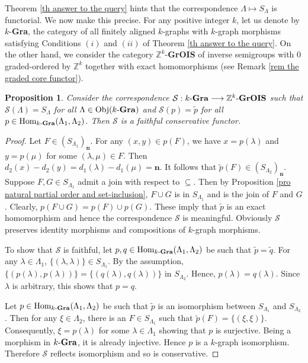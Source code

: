 \documentclass[a4paper,reqno,11pt]{amsart}
\numberwithin{equation}{section}
\newtheorem{prop}[thm]{Proposition}
\theoremstyle{definition}
\theoremstyle{remark}
\newcommand{\Obj}{\operatorname{Obj}}
\newcommand{\Hom}{\operatorname{Hom}}
\newcommand{\N}{\mathbf{n}}
\begin{document}
Theorem \ref{th answer to the query} hints that the correspondence $\Lambda\longmapsto S_\Lambda$ is functorial. We now make this precise. For any positive integer $k$, let us denote by $k$-\textbf{Gra}, the category of all finitely aligned $k$-graphs with $k$-graph morphisms satisfying Conditions $(i)$ and $(ii)$ of Theorem \ref{th answer to the query}. On the other hand, we consider the category $\mathbb{Z}^k$-\textbf{GrOIS} of inverse semigroups with $0$ graded-ordered by $\mathbb{Z}^k$ together with exact homomorphisms (see Remark \ref{rem the graded core functor}).

\begin{prop}\label{pro Inverse semigroup construction as a functor}
Consider the correspondence $\mathcal{S}:k\textup{-\textbf{Gra}}\longrightarrow \mathbb{Z}^k\textup{-\textbf{GrOIS}}$ such that $\mathcal{S}(\Lambda)=S_\Lambda$ for all $\Lambda\in \Obj(k\textup{-\textbf{Gra}})$ and $\mathcal{S}(p)=\tilde{p}$ for all $p\in \Hom_{k\textup{-\textbf{Gra}}}(\Lambda_1,\Lambda_2)$. Then $\mathcal{S}$ is a faithful conservative functor.
\end{prop}
\begin{proof}
Let $F\in (S_{\Lambda_1})_\N$. For any $(x,y)\in p(F)$, we have $x=p(\lambda)$ and $y=p(\mu)$ for some $(\lambda,\mu)\in F$. Then $d_2(x)-d_2(y)=d_1(\lambda)-d_1(\mu)=\N$. It follows that $\tilde{p}(F)\in (S_{\Lambda_2})_\N$. Suppose $F,G\in S_{\Lambda_1}$ admit a join with respect to $\subseteq$. Then by Proposition \ref{pro natural partial order and set-inclusion}, $F\cup G$ is in $S_{\Lambda_1}$ and is the join of $F$ and $G$. Clearly, $p(F\cup G)=p(F)\cup p(G)$. These imply that $\tilde{p}$ is an exact homomorphism and hence the correspondence $\mathcal{S}$ is meaningful. Obviously $\mathcal{S}$ preserves identity morphisms and compositions of $k$-graph morphisms. 

To show that $\mathcal{S}$ is faithful, let $p,q\in \Hom_{k\textup{-\textbf{Gra}}}(\Lambda_1,\Lambda_2)$ be such that $\tilde{p}=\tilde{q}$. For any $\lambda\in \Lambda_1$, $\{(\lambda,\lambda)\}\in S_{\Lambda_1}$. By the assumption, $\{(p(\lambda),p(\lambda))\}=\{(q(\lambda),q(\lambda))\}$ in $S_{\Lambda_2}$. Hence, $p(\lambda)=q(\lambda)$. Since $\lambda$ is arbitrary, this shows that $p=q$. 

Let $p\in \Hom_{k\textup{-\textbf{Gra}}}(\Lambda_1,\Lambda_2)$ be such that $\tilde{p}$ is an isomorphism between $S_{\Lambda_1}$ and $S_{\Lambda_2}$. Then for any $\xi\in \Lambda_2$, there is an $F\in S_{\Lambda_1}$ such that $\tilde{p}(F)=\{(\xi,\xi)\}$. Consequently, $\xi=p(\lambda)$ for some $\lambda\in \Lambda_1$ showing that $p$ is surjective. Being a morphism in $k\textup{-\textbf{Gra}}$, it is already injective. Hence $p$ is a $k$-graph isomorphism. Therefore $\mathcal{S}$ reflects isomorphism and so is conservative. 
\end{proof}
\end{document}
